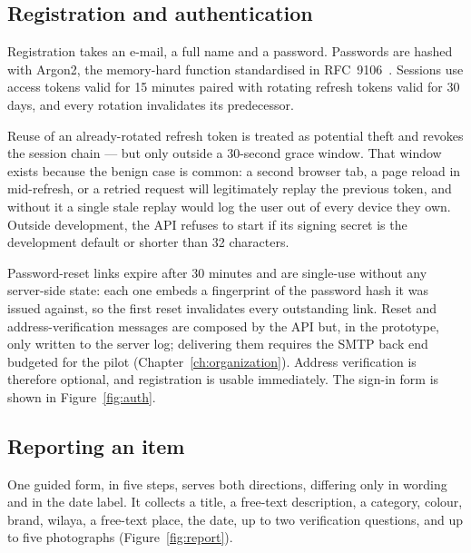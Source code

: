 
\subsection{Registration and authentication}

Registration takes an e-mail, a full name and a password. Passwords are hashed
with Argon2, the memory-hard function standardised in RFC~9106~\cite{argon2rfc}.
Sessions use access tokens valid for 15 minutes paired with rotating refresh
tokens valid for 30 days, and every rotation invalidates its predecessor.

Reuse of an already-rotated refresh token is treated as potential theft and
revokes the session chain --- but only outside a 30-second grace window. That
window exists because the benign case is common: a second browser tab, a page
reload in mid-refresh, or a retried request will legitimately replay the
previous token, and without it a single stale replay would log the user out of
every device they own. Outside development, the API refuses to start if its
signing secret is the development default or shorter than 32 characters.

Password-reset links expire after 30 minutes and are single-use without any
server-side state: each one embeds a fingerprint of the password hash it was
issued against, so the first reset invalidates every outstanding link. Reset and
address-verification messages are composed by the API but, in the prototype,
only written to the server log; delivering them requires the SMTP back end
budgeted for the pilot (Chapter~\ref{ch:organization}). Address verification is
therefore optional, and registration is usable immediately. The sign-in form is
shown in Figure~\ref{fig:auth}.


\subsection{Reporting an item}

One guided form, in five steps, serves both directions, differing only in
wording and in the date label. It collects a title, a free-text description, a
category, colour, brand, wilaya, a free-text place, the date, up to two
verification questions, and up to five photographs (Figure~\ref{fig:report}).


